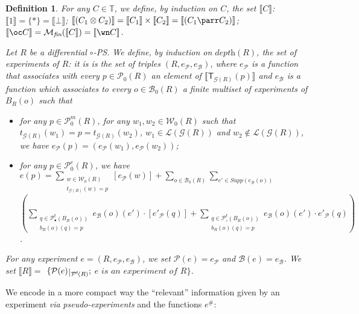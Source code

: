 \documentclass{article}
\newcommand{\ltens}{\otimes}
\newcommand{\lpar}{\parr}
\newcommand{\target}[1]{t_{#1}}
\theoremstyle{plain}
\newtheorem{definition}{Definition}
\newcommand{\leftwires}[1]{\mathcal{L}(#1)}
\newcommand{\groundof}[1]{\mathcal{G}(#1)}
\newcommand{\finitemultisets}[1]{\mathcal{M}_\textit{fin}(#1)}
\def\restriction#1#2{\mathchoice
              {\setbox1\hbox{${\displaystyle #1}_{\scriptstyle #2}$}
              \restrictionaux{#1}{#2}}
              {\setbox1\hbox{${\textstyle #1}_{\scriptstyle #2}$}
              \restrictionaux{#1}{#2}}
              {\setbox1\hbox{${\scriptstyle #1}_{\scriptscriptstyle #2}$}
              \restrictionaux{#1}{#2}}
              {\setbox1\hbox{${\scriptscriptstyle #1}_{\scriptscriptstyle #2}$}
              \restrictionaux{#1}{#2}}}
\def\restrictionaux#1#2{{#1\,\smash{\vrule height .8\ht1 depth .85\dp1}}_{\,#2}}
\newcommand{\cod}{\oc}
\newcommand{\contr}{\wn}
\newcommand{\portsatzero}[1]{\mathcal{P}_0(#1)}
\newcommand{\wiresatzero}[1]{\mathcal{W}_0(#1)}
\newcommand{\ports}[1]{\mathcal{P}(#1)}
\newcommand{\conclusions}[1]{\mathcal{P}^{\textsf{f}}(#1)}
\newcommand{\multiplicativeportsatzero}[1]{\mathcal{P}_0^\textit{m}(#1)}
\newcommand{\sm}[1]{\llbracket #1 \rrbracket}
\newcommand{\exponentialportsatzero}[1]{\mathcal{P}_0^\textit{e}(#1)}
\newcommand{\conclusionscirc}[1]{\mathcal{P}_\circ^{\textsf{f}}(#1)}
\newcommand{\conclusionsnotcirc}[1]{\mathcal{P}_\bullet^{\textsf{f}}(#1)}
\newcommand{\boxes}[1]{\mathcal{B}(#1)}
\newcommand{\boxesatzero}[1]{\mathcal{B}_{0}(#1)}
\newcommand{\supp}[1]{\textit{Supp}(#1)}
\begin{document}
\begin{definition}\label{defin: experiment}
For any $C \in \mathbb{T}$, we define, by induction on $C$, the set $\sm{C}$: $\sm{1} = \{ \ast \} = \sm{\bot}$; $\sm{(C_1 \ltens C_2)} = \sm{C_1} \times \sm{C_2} = \sm{(C_1 \lpar C_2)}$; $\sm{\cod C} = \finitemultisets{\sm{C}} = \sm{\contr C}$.

Let $R$ be a differential $\circ$-PS. We define, by induction on $\textit{depth}(R)$, the set of \emph{experiments of $R$}: it is is the set of triples $(R, e_\mathcal{P}, e_\mathcal{B})$, where $e_\mathcal{P}$ is a function that associates with every $p \in \portsatzero{R}$ an element of $\sm{\textsf{T}_{\groundof{R}}(p)}$ and $e_\mathcal{B}$ is a function which associates to every $o \in \boxesatzero{R}$ a finite multiset of experiments of $B_R(o)$ such that
\begin{itemize}
\item for any $p \in \multiplicativeportsatzero{R}$, for any $w_1, w_2 \in \wiresatzero{R}$ such that $\target{\groundof{R}}(w_1) = p = \target{\groundof{R}}(w_2)$, $w_1 \in \leftwires{\groundof{R}}$ and $w_2 \notin \leftwires{\groundof{R}}$, we have $e_\mathcal{P}(p) = (e_\mathcal{P}(w_1), e_\mathcal{P}(w_2))$;
\item for any $p \in \exponentialportsatzero{R}$,
we have $e(p) = \sum_{\substack{w \in \wiresatzero{R}\\ \target{\groundof{R}}(w) = p}} [e_\mathcal{P}(w)] +  \sum_{o \in \boxesatzero{R}} \sum_{e' \in \supp{e_\mathcal{B}(o)}}$ $(\sum_{\substack{q \in \conclusionsnotcirc{B_R(o)}\\ b_R(o)(q) = p}} e_\mathcal{B}(o)(e') \cdot [{e'}_\mathcal{P}(q)] + \sum_{\substack{q \in \conclusionscirc{B_R(o)}\\ b_R(o)(q) = p}} e_\mathcal{B}(o)(e') \cdot {e'}_\mathcal{P}(q) )$.
\end{itemize}
For any experiment $e = (R, e_\mathcal{P}, e_\mathcal{B})$, we set $\ports{e} = e_\mathcal{P}$ and $\boxes{e} = e_\mathcal{B}$. We set $\sm{R} =$ $\{ \restriction{\ports{e}}{\conclusions{R}} ;$ $e \textit{ is an experiment of } R \}$.
\end{definition}

We encode in a more compact way the ``relevant'' information given by an experiment \emph{via} \emph{pseudo-experiments} and the functions $e^\#$:
\end{document}
